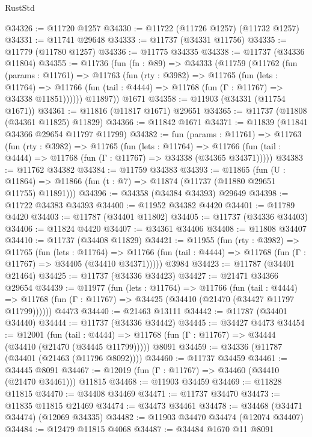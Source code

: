 \begin{lexlean}{RustStd}
\begin{coremodule}
@34326 := @11720 @1257
@34330 := @11722 (@11726 @1257) (@11732 @1257)
@34331 := @11741 @29648
@34333 := @11737 (@34331 @11756)
@34335 := @11779 (@11780 @1257)
@34336 := @11775 @34335
@34338 := @11737 (@34336 @11804)
@34355 := @11736
    (fun (fn : @89) =>
    @34333
      (@11759
        (@11762
          (fun (params : @11761) =>
          @11763
            (fun (rty : @3982) =>
            @11765
              (fun (lets : @11764) =>
              @11766 (fun (tail : @4444) => @11768 (fun (Γ : @11767) => @34338 @11851))))))
        @11897))
    @1671
@34358 := @11903 (@34331 (@11754 @1671))
@34361 := @11816 (@11817 @1671) @29651
@34365 := @11737 (@11808 (@34361 @11825) @11829)
@34366 := @11842 @1671
@34371 := @11839 (@11841 @34366 @29654 @11797 @11799)
@34382 := fun (params : @11761) =>
  @11763
    (fun (rty : @3982) =>
    @11765
      (fun (lets : @11764) =>
      @11766 (fun (tail : @4444) => @11768 (fun (Γ : @11767) => @34338 (@34365 @34371)))))
@34383 := @11762 @34382
@34384 := @11759 @34383
@34393 := @11865
    (fun (U : @11864) => @11866 (fun (t : @7) => @11874 (@11737 (@11880 @29651 @11755) @11891)))
@34396 := @34358 (@34384 @34393) @29649
@34398 := @11722 @34383 @34393
@34400 := @11952 @34382 @4420
@34401 := @11789 @4420
@34403 := @11787 (@34401 @11802)
@34405 := @11737 (@34336 @34403)
@34406 := @11824 @4420
@34407 := @34361 @34406
@34408 := @11808 @34407
@34410 := @11737 (@34408 @11829)
@34421 := @11955
    (fun (rty : @3982) =>
    @11765
      (fun (lets : @11764) =>
      @11766 (fun (tail : @4444) => @11768 (fun (Γ : @11767) => @34405 (@34410 @34371)))))
    @3984
@34423 := @11787 (@34401 @21464)
@34425 := @11737 (@34336 @34423)
@34427 := @21471 @34366 @29654
@34439 := @11977
    (fun (lets : @11764) =>
    @11766
      (fun (tail : @4444) =>
      @11768 (fun (Γ : @11767) => @34425 (@34410 (@21470 (@34427 @11797 @11799))))))
    @4473
@34440 := @21463 @13111
@34442 := @11787 (@34401 @34440)
@34444 := @11737 (@34336 @34442)
@34445 := @34427 @4473
@34454 := @12001
    (fun (tail : @4444) => @11768 (fun (Γ : @11767) => @34444 (@34410 (@21470 (@34445 @11799)))))
    @8091
@34459 := @34336 (@11787 (@34401 (@21463 (@11796 @8092))))
@34460 := @11737 @34459
@34461 := @34445 @8091
@34467 := @12019 (fun (Γ : @11767) => @34460 (@34410 (@21470 @34461))) @11815
@34468 := @11903 @34459
@34469 := @11828 @11815
@34470 := @34408 @34469
@34471 := @11737 @34470
@34473 := @11835 @11815 @21469
@34474 := @34473 @34461
@34478 := @34468 (@34471 @34474) (@12069 @34335)
@34482 := @11903 @34470 @34474 (@12074 @34407)
@34484 := @12479 @11815 @4068
@34487 := @34484 @1670 @11 @8091

\end{coremodule}
\end{lexlean}
